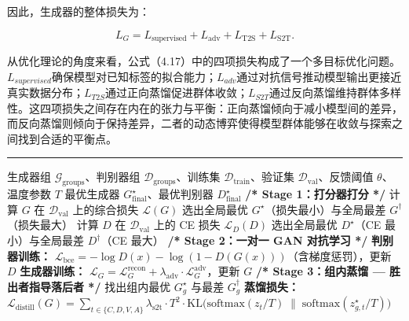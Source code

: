 因此，生成器的整体损失为：

\begin{equation}
L_G
=
L_{\text{supervised}}
+
L_{\text{adv}}
+
L_{\text{T2S}}
+
L_{\text{S2T}}.
\end{equation}

从优化理论的角度来看，公式（4.17）中的四项损失构成了一个多目标优化问题。$L_{supervised}$确保模型对已知标签的拟合能力；$L_{adv}$通过对抗信号推动模型输出更接近真实数据分布；$L_{T2S}$通过正向蒸馏促进群体收敛；$L_{S2T}$通过反向蒸馏维持群体多样性。这四项损失之间存在内在的张力与平衡：正向蒸馏倾向于减小模型间的差异，而反向蒸馏则倾向于保持差异，二者的动态博弈使得模型群体能够在收敛与探索之间找到合适的平衡点。

\noindent\rule{\textwidth}{0.4pt}

\begin{algorithm}[H]
\caption{逆向师生蒸馏（S2T）}
\label{alg:rtwave}
\begin{algorithmic}[0]
\Require 生成器组 $\mathcal{G}_{\text{groups}}$、判别器组 $\mathcal{D}_{\text{groups}}$、训练集 $\mathcal{D}_{\text{train}}$、验证集 $\mathcal{D}_{\mathrm{val}}$、反馈阈值 $\theta$、温度参数 $T$
\Ensure 最优生成器 $G^{\star}_{\text{final}}$、最优判别器 $D^{\star}_{\text{final}}$
\Statex
{}
    \Statex
    \State \textbf{/* Stage 1：打分器打分 */}
        \State 计算 $G$ 在 $\mathcal{D}_{\mathrm{val}}$ 上的综合损失 $\mathcal{L}(G)$
    \EndFor
    \State 选出全局最优 $G^{\star}$（损失最小）与全局最差 $G^{\dagger}$（损失最大）
        \State 计算 $D$ 在 $\mathcal{D}_{\mathrm{val}}$ 上的 CE 损失 $\mathcal{L}_D(D)$
    \EndFor
    \State 选出全局最优 $D^{\star}$（CE 最小）与全局最差 $D^{\dagger}$（CE 最大）
    \Statex
    \State \textbf{/* Stage 2：一对一 GAN 对抗学习 */}
            \State \textbf{判别器训练：} $\mathcal{L}_{\text{bce}} = -\log D(x) - \log(1 - D(G(x)))$（含梯度惩罚），更新 $D$
            \State \textbf{生成器训练：} $\mathcal{L}_G = \mathcal{L}_G^{\text{recon}} + \lambda_{\text{adv}} \cdot \mathcal{L}_G^{\text{adv}}$，更新 $G$
        \EndFor
    \EndFor
    \Statex
    \State \textbf{/* Stage 3：组内蒸馏 — 胜出者指导落后者 */}
        \State 找出组内最优 $G^{\star}_g$ 与最差 $G^{\dagger}_g$
        \State \textbf{蒸馏损失：} $\mathcal{L}_{\text{distill}}(G) = \sum_{t \in \{C,D,V,A\}} \lambda_{\text{s2t}} \cdot T^2 \cdot \mathrm{KL}\big(\mathrm{softmax}(z_t/T) \;\big\|\; \mathrm{softmax}(z^{\star}_{g,t}/T)\big)$

\end{algorithmic}
\end{algorithm}
